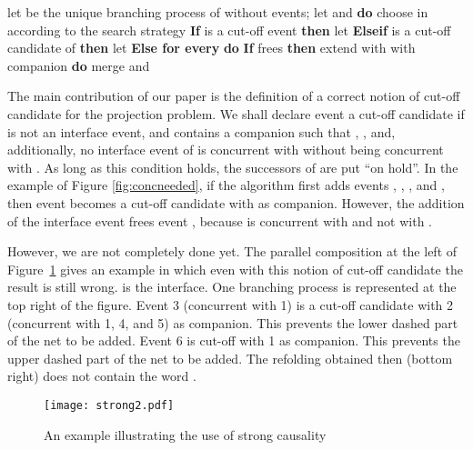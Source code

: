 \documentclass{llncs}
\begin{document}
\begin{algorithm}[htbp]
\begin{algorithmic}
\State let  be the unique branching process of  without events; let  and 
  {\bf do}
\State\hspace*{0.4cm} choose  in  according to the search strategy
\State\hspace*{0.4cm} {\bf If}  is a cut-off event {\bf then} let 
\State\hspace*{0.4cm} {\bf Elseif}  is a cut-off candidate of  {\bf then} let 
\State\hspace*{0.4cm} {\bf Else for every}  {\bf do}
\State\hspace*{0.8cm} {\bf If}  frees  {\bf then} 
\State\hspace*{0.4cm} extend  with 
  with companion  {\bf do} merge  and 
\end{algorithmic}
\caption{Unfolding procedure for a product .}
\label{algo:unfolding2}
\end{algorithm}

The main contribution of our paper is the definition of a correct notion of cut-off candidate for the projection problem. 
We shall declare event  a  cut-off candidate if  is not an interface event,
and  contains a companion  such that , , and, additionally, no interface event  of  is concurrent with  without being concurrent with .
As long as this condition holds, the successors of  are put ``on hold''. In the example of Figure \ref{fig:concneeded}, if the algorithm first adds events , , , and , then event  becomes a cut-off candidate with  as companion. However, the addition of the interface event  frees event , because  is concurrent with  and not with .

However, we are not completely done yet. 
The parallel composition at the left of Figure~\ref{fig:strong} gives an example in which 
even with this notion of cut-off candidate the result is still wrong.
 is the interface.
One branching process is represented at the top right of the figure. 
Event 3 (concurrent with 1) is a cut-off candidate with 2 (concurrent with 1, 4, and 5) as companion.
This prevents the lower dashed part of the net to be added.
Event 6 is cut-off with 1 as companion.
This prevents the upper dashed part of the net to be added.
The refolding obtained then (bottom right) does not contain the word .

\begin{figure}[htbp]
\centering
\texttt{[image: strong2.pdf]}
\caption{An example illustrating the use of strong causality}\label{fig:strong}
\end{figure}
\end{document}
